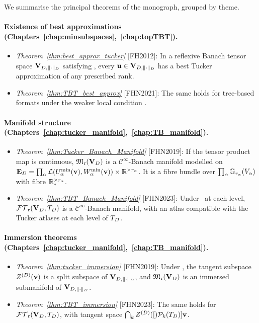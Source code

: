 We summarise the principal theorems of the monograph, grouped by theme.

\paragraph{Existence of best approximations
(Chapters~\ref{chap:minsubspaces},~\ref{chap:topTBT}).}

\begin{itemize}
\item \emph{Theorem~\ref{thm:best_approx_tucker}} [FH2012]: In a
    reflexive Banach tensor space $\mathbf{V}_{D,\|\cdot\|_D}$ satisfying \condINJ,
    every $\mathbf{u} \in \mathbf{V}_{D,\|\cdot\|_D}$ has a best Tucker approximation of any
    prescribed rank.
\item \emph{Theorem~\ref{thm:TBT_best_approx}} [FHN2021]: The same
    holds for tree-based formats under the weaker local condition
    \condINJ[$T_D$].
\end{itemize}

\paragraph{Manifold structure
(Chapters~\ref{chap:tucker_manifold},~\ref{chap:TB_manifold}).}

\begin{itemize}
\item \emph{Theorem~\ref{thm:Tucker_Banach_Manifold}} [FHN2019]:
    If the tensor product map is continuous, $\mathfrak{M}_{\mathfrak{r}}(\mathbf{V}_D)$
    is a $\mathcal{C}^\infty$-Banach manifold modelled on
    $\mathbf{E}_{D} = \prod_\alpha \mathcal{L}(U^{\min}_{\alpha}(\mathbf{v}),
    W^{\min}_{\alpha}(\mathbf{v})) \times \mathbb{R}^{\times r_\alpha}$.
    It is a fibre bundle over $\prod_\alpha \mathbb{G}_{r_\alpha}(V_\alpha)$
    with fibre $\mathbb{R}^{\times r_\alpha}_*$.
\item \emph{Theorem~\ref{thm:TBT_Banach_Manifold}} [FHN2023]:
    Under \condINJ\ at each level, $\mathcal{FT}_{\mathfrak{r}}(\mathbf{V}_D,T_D)$ is a $\mathcal{C}^\infty$-Banach
    manifold, with an atlas compatible with the Tucker atlases at
    each level of $T_D$.
\end{itemize}

\paragraph{Immersion theorems
(Chapters~\ref{chap:tucker_manifold},~\ref{chap:TB_manifold}).}

\begin{itemize}
\item \emph{Theorem~\ref{thm:tucker_immersion}} [FHN2019]:
    Under \condINJ, the tangent subspace $Z^{(D)}(\mathbf{v})$ is a split
    subspace of $\mathbf{V}_{D,\|\cdot\|_D}$, and $\mathfrak{M}_{\mathfrak{r}}(\mathbf{V}_D)$ is an immersed
    submanifold of $\mathbf{V}_{D,\|\cdot\|_D}$.
\item \emph{Theorem~\ref{thm:TBT_immersion}} [FHN2023]:
    The same holds for $\mathcal{FT}_{\mathfrak{r}}(\mathbf{V}_D,T_D)$, with tangent space
    $\bigcap_k Z^{(D)}([)\mathcal{P}_{k}(T_D)]{\mathbf{v}}$.
\end{itemize}

